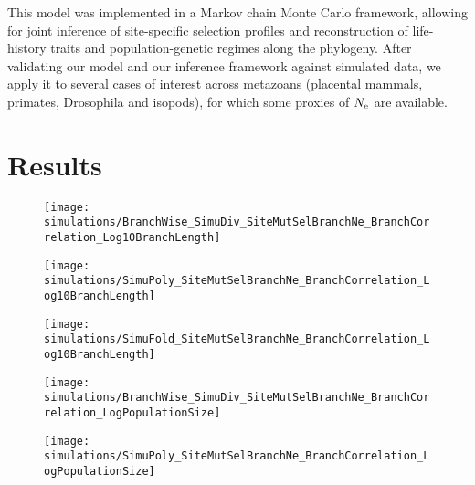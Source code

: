 This model was implemented in a \gls{Markov chain Monte Carlo} framework, allowing for joint inference of site-specific selection profiles and reconstruction of life-history traits and population-genetic regimes along the phylogeny.
After validating our model and our inference framework against simulated data, we apply it to several cases of interest across metazoans (placental mammals, primates, Drosophila and isopods), for which some proxies of $N_{\text{e}}$ are available.


\section{Results}
\label{sec:Results}

\begin{figure}[h]
    \centering
    \begin{minipage}{0.32\linewidth}
        \texttt{[image: simulations/BranchWise\_SimuDiv\_SiteMutSelBranchNe\_BranchCorrelation\_Log10BranchLength]}
    \end{minipage}
    \hfill
    \begin{minipage}{0.32\linewidth}
        \texttt{[image: simulations/SimuPoly\_SiteMutSelBranchNe\_BranchCorrelation\_Log10BranchLength]}
    \end{minipage}
    \hfill
    \begin{minipage}{0.32\linewidth}
        \texttt{[image: simulations/SimuFold\_SiteMutSelBranchNe\_BranchCorrelation\_Log10BranchLength]}
    \end{minipage}
    \hfill
    \begin{minipage}{0.32\linewidth}
        \texttt{[image: simulations/BranchWise\_SimuDiv\_SiteMutSelBranchNe\_BranchCorrelation\_LogPopulationSize]}
    \end{minipage}
    \hfill
    \begin{minipage}{0.32\linewidth}
        \texttt{[image: simulations/SimuPoly\_SiteMutSelBranchNe\_BranchCorrelation\_LogPopulationSize]}
    \end{minipage}
    \hfill

\end{figure}
